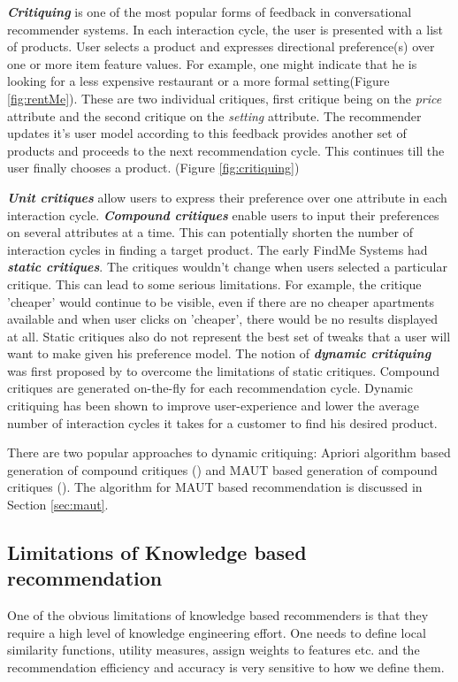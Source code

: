 \textit{\textbf{Critiquing}} is one of the most popular forms of feedback in conversational recommender systems. In each interaction cycle, the user is presented with a list of products.
User selects a product and expresses directional preference(s) over one or more item feature values. 
For example, one might indicate that he is looking for a less expensive restaurant or a more formal setting(Figure \ref{fig:rentMe}). These are two individual critiques, first critique being on the \textit{price} attribute and the second critique on the \textit{setting} attribute. 
The recommender updates it's user model according to this feedback provides another set of products and proceeds to the next recommendation cycle. This continues till the user finally chooses a product. (Figure \ref{fig:critiquing})

\textit{\textbf{Unit critiques}} allow users to express their preference over one attribute in each interaction cycle. \textit{\textbf{Compound critiques}} enable users to input their preferences on several attributes at a time. This can potentially shorten the number of interaction cycles in finding a target product.
The early FindMe Systems \cite{burkeEarlierSystems} had \textit{\textbf{static critiques}}. The critiques wouldn't change when users selected a particular critique. 
This can lead to some serious limitations.
For example, the critique 'cheaper' would continue to be visible, even if there are no cheaper apartments available and when user clicks on 'cheaper', there would be no results displayed at all.
Static critiques also do not represent the best set of tweaks that a user will want to make given his preference model.
The notion of \textit{\textbf{dynamic critiquing}} was first proposed by \cite{mccarthy2004dynamic} to overcome the limitations of static critiques.
Compound critiques are generated on-the-fly for each recommendation cycle. Dynamic critiquing has been shown to improve user-experience and lower the average number of interaction cycles it takes for a customer to find his desired product.

There are two popular approaches to dynamic critiquing: Apriori algorithm based generation of compound critiques (\cite{mccarthy2004dynamic}) and MAUT based generation of compound critiques (\cite{mautPaper}). 
The algorithm for MAUT based recommendation is discussed in Section \ref{sec:maut}.

\subsection{Limitations of Knowledge based recommendation}
One of the obvious limitations of knowledge based recommenders is that they require a high level of knowledge engineering effort.
One needs to define local similarity functions, utility measures, assign weights to features etc. and the recommendation efficiency and accuracy is very sensitive to how we define them.

